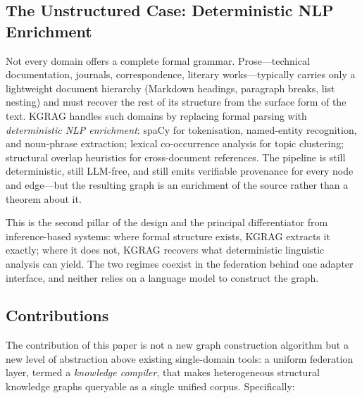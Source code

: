 \documentclass[10pt]{article}
\begin{document}
\subsection{The Unstructured Case: Deterministic NLP Enrichment}

Not every domain offers a complete formal grammar. Prose---technical
documentation, journals, correspondence, literary works---typically carries
only a lightweight document hierarchy (Markdown headings, paragraph breaks,
list nesting) and must recover the rest of its structure from the surface
form of the text. KGRAG handles such domains by replacing formal parsing with
\emph{deterministic NLP enrichment}: spaCy for tokenisation, named-entity
recognition, and noun-phrase extraction; lexical co-occurrence analysis for
topic clustering; structural overlap heuristics for cross-document references.
The pipeline is still deterministic, still LLM-free, and still emits
verifiable provenance for every node and edge---but the resulting graph is an
enrichment of the source rather than a theorem about it.

This is the second pillar of the design and the principal differentiator from
inference-based systems: where formal structure exists, KGRAG extracts it
exactly; where it does not, KGRAG recovers what deterministic linguistic
analysis can yield. The two regimes coexist in the federation behind one
adapter interface, and neither relies on a language model to construct the
graph.

\subsection{Contributions}

The contribution of this paper is not a new graph construction algorithm but a
new level of abstraction above existing single-domain tools: a uniform
federation layer, termed a \emph{knowledge compiler}, that makes heterogeneous
structural knowledge graphs queryable as a single unified corpus. Specifically:
\end{document}
